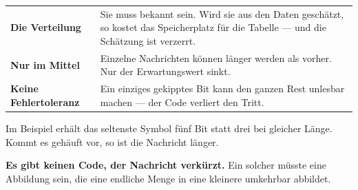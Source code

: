 \begin{warnung}
\begin{center}
{\small
\renewcommand{\arraystretch}{1.52}
\begin{tabular}{@{}P{2.4cm}P{6.2cm}@{}}
\toprule
\textbf{Die Verteilung} & Sie muss bekannt sein. Wird sie aus den Daten geschätzt, so kostet das Speicherplatz für die Tabelle --- und die Schätzung ist verzerrt.\\
\textbf{Nur im Mittel} & Einzelne Nachrichten können länger werden als vorher. Nur der Erwartungswert sinkt.\\
\textbf{Keine Fehlertoleranz} & Ein einziges gekipptes Bit kann den ganzen Rest unlesbar machen --- der Code verliert den Tritt.\\
\bottomrule
\end{tabular}}
\end{center}

Im Beispiel erhält das seltenste Symbol fünf Bit statt drei bei gleicher Länge. Kommt es gehäuft vor, so ist die Nachricht länger.

\begin{center}
\begin{minipage}{0.9\textwidth}
\textbf{Es gibt keinen Code, der  Nachricht verkürzt.} Ein solcher müsste eine Abbildung sein, die eine endliche Menge in eine kleinere umkehrbar abbildet.
\end{minipage}
\end{center}

\begin{center}
\begin{minipage}{0.88\textwidth}
\end{minipage}
\end{center}

\begin{center}
\begin{minipage}{0.88\textwidth}
\end{minipage}
\end{center}
\end{warnung}

